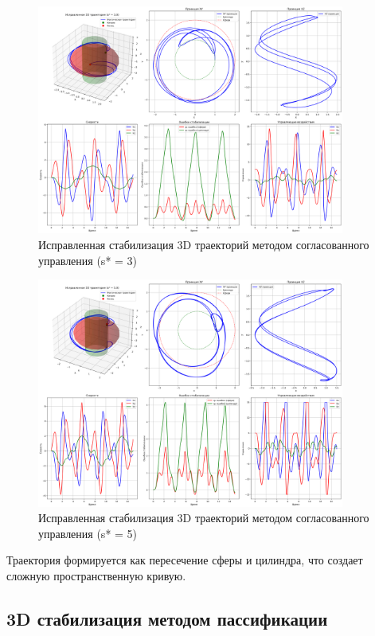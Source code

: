 \begin{figure}[H]
\centering
\includegraphics[width=0.9\textwidth]{images/task2/corrected_3d_s3.0.png}
\caption{Исправленная стабилизация 3D траекторий методом согласованного управления (s* = 3)}
\label{fig:corrected_3d_s3}
\end{figure}

\begin{figure}[H]
\centering
\includegraphics[width=0.9\textwidth]{images/task2/corrected_3d_s5.0.png}
\caption{Исправленная стабилизация 3D траекторий методом согласованного управления (s* = 5)}
\label{fig:corrected_3d_s5}
\end{figure}

Траектория формируется как пересечение сферы и цилиндра, что создает сложную пространственную кривую.

\subsection{3D стабилизация методом пассификации}

